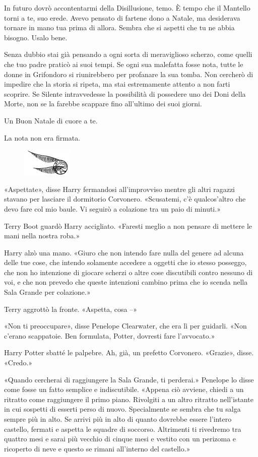 In futuro dovrò accontentarmi della Disillusione, temo. È tempo che il Mantello torni a te, suo erede. Avevo pensato di fartene dono a Natale, ma desiderava tornare in mano tua prima di allora. Sembra che si aspetti che tu ne abbia bisogno. Usalo bene.

Senza dubbio stai già pensando a ogni sorta di meraviglioso scherzo, come quelli che tuo padre praticò ai suoi tempi. Se ogni sua malefatta fosse nota, tutte le donne in Grifondoro si riunirebbero per profanare la sua tomba. Non cercherò di impedire che la storia si ripeta, ma stai estremamente attento a non farti scoprire. Se Silente intravvedesse la possibilità di possedere uno dei Doni della Morte, non se la farebbe scappare fino all’ultimo dei suoi giorni.

Un Buon Natale di cuore a te.

La nota non era firmata.

\begin{figure}[h!]
        \includegraphics[scale=0.4]{boccino.png}
        \centering
\end{figure}

«Aspettate», disse Harry fermandosi all’improvviso mentre gli altri ragazzi stavano per lasciare il dormitorio Corvonero. «Scusatemi, c’è qualcos’altro che devo fare col mio baule. Vi seguirò a colazione tra un paio di minuti.»

Terry Boot guardò Harry accigliato. «Faresti meglio a non pensare di mettere le mani nella nostra roba.»

Harry alzò una mano. «Giuro che non intendo fare nulla del genere ad alcuna delle tue cose, che intendo solamente accedere a oggetti che io stesso posseggo, che non ho intenzione di giocare scherzi o altre cose discutibili contro nessuno di voi, e che non prevedo che queste intenzioni cambino prima che io scenda nella Sala Grande per colazione.»

Terry aggrottò la fronte. «Aspetta, cosa –»

«Non ti preoccupare», disse Penelope Clearwater, che era lì per guidarli. «Non c’erano scappatoie. Ben formulata, Potter, dovresti fare l’avvocato.»

Harry Potter sbatté le palpebre. Ah, già, un prefetto Corvonero. «Grazie», disse. «Credo.»

«Quando cercherai di raggiungere la Sala Grande, ti perderai.» Penelope lo disse come fosse un fatto semplice e indiscutibile. «Appena ciò avviene, chiedi a un ritratto come raggiungere il primo piano. Rivolgiti a un altro ritratto nell’istante in cui sospetti di esserti perso di nuovo. Specialmente se sembra che tu salga sempre più in alto. Se arrivi più in alto di quanto dovrebbe essere l’intero castello, fermati e aspetta le squadre di soccorso. Altrimenti ti rivedremo tra quattro mesi e sarai più vecchio di cinque mesi e vestito con un perizoma e ricoperto di neve e questo se rimani all’interno del castello.»


